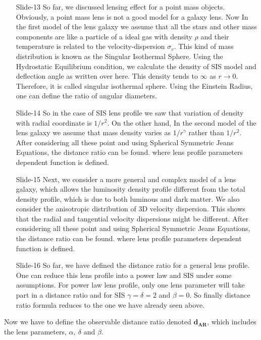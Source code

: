 \documentclass[12pt]{report}
\begin{document}
\begin{itemize}
 \item[\ding{74} Slide-13]
So far, we discussed lensing effect for a point mass objects. Obviously, a point mass lens is not a good model for a galaxy lens. Now In the first model of the lens galaxy we assume that all the stars and other mass components are like a particle of a ideal gas  with density $\rho$ and their temperature is related to the velocity-dispersion $\sigma_v$. This kind of mass distribution is known as the Singular Isothermal Sphere. Using the Hydrostatic Equilibrium condition, we calculate the density of SIS model and deflection angle as written over here. This density tends to $\infty$ as $r\rightarrow 0$. Therefore, it is called singular isothermal sphere. Using the Einstein Radius, one can define the ratio of angular diameters.

 \item[\ding{74} Slide-14]
So in the case of SIS lens profile we saw that variation of density with radial coordinate is $1/r^2$. On the other hand, In the second model of the lens galaxy we assume that mass density varies as $1/r^\gamma$ rather than $1/r^2$. After considering all these point and using Spherical Symmetric Jeans Equations, the distance ratio can be found. where lens profile parameters dependent function is defined. 

 \item[\ding{74} Slide-15]
Next, we consider a more general and complex model of a lens galaxy, which allows the luminosity density profile different from the total density profile, which is due to both luminous and dark matter. We also consider the anisotropic distribution of 3D velocity dispersion. This shows that the radial and tangential velocity dispersions might be different. After considering all these point and using Spherical Symmetric Jeans Equations, the distance ratio can be found. where lens profile parameters dependent function is defined.

 \item[\ding{74} Slide-16]
So far, we have defined the distance ratio for a general lens profile. One can reduce this lens profile into a power law and SIS under some assumptions. For power law lens profile, only one lens parameter will take part in a distance ratio and for SIS $\gamma =\delta =2$ and $\beta=0$. So finally distance ratio formula reduces to the one we have already seen above.


 \end{itemize}
Now we have to define the observable distance ratio denoted $\boldsymbol{d}_{\mathbf{A} \mathbf{R}}$, which includes the lens parameters, $\alpha,~\delta$ and $\beta$.
\end{document}
